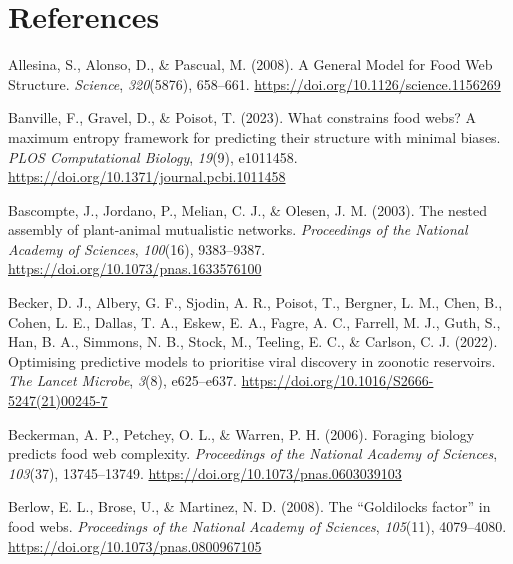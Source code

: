 \documentclass[
]{article}
\newlength{\cslhangindent}
\newenvironment{CSLReferences}[2] %
 {\begin{list}{}{%
  \setlength{\itemindent}{0pt}
  \setlength{\leftmargin}{0pt}
  \setlength{\parsep}{0pt}
  \ifodd #1
   \setlength{\leftmargin}{\cslhangindent}
   \setlength{\itemindent}{-1\cslhangindent}
  \fi
  \setlength{\itemsep}{#2\baselineskip}}}
 {\end{list}}
\begin{document}
\section*{References}\label{references}

\label{refs}
\begin{CSLReferences}{1}{0}
Allesina, S., Alonso, D., \& Pascual, M. (2008). A {General Model} for
{Food Web Structure}. \emph{Science}, \emph{320}(5876), 658--661.
\url{https://doi.org/10.1126/science.1156269}

Banville, F., Gravel, D., \& Poisot, T. (2023). What constrains food
webs? {A} maximum entropy framework for predicting their structure with
minimal biases. \emph{PLOS Computational Biology}, \emph{19}(9),
e1011458. \url{https://doi.org/10.1371/journal.pcbi.1011458}

Bascompte, J., Jordano, P., Melian, C. J., \& Olesen, J. M. (2003). The
nested assembly of plant-animal mutualistic networks. \emph{Proceedings
of the National Academy of Sciences}, \emph{100}(16), 9383--9387.
\url{https://doi.org/10.1073/pnas.1633576100}

Becker, D. J., Albery, G. F., Sjodin, A. R., Poisot, T., Bergner, L. M.,
Chen, B., Cohen, L. E., Dallas, T. A., Eskew, E. A., Fagre, A. C.,
Farrell, M. J., Guth, S., Han, B. A., Simmons, N. B., Stock, M.,
Teeling, E. C., \& Carlson, C. J. (2022). Optimising predictive models
to prioritise viral discovery in zoonotic reservoirs. \emph{The Lancet
Microbe}, \emph{3}(8), e625--e637.
\url{https://doi.org/10.1016/S2666-5247(21)00245-7}

Beckerman, A. P., Petchey, O. L., \& Warren, P. H. (2006). Foraging
biology predicts food web complexity. \emph{Proceedings of the National
Academy of Sciences}, \emph{103}(37), 13745--13749.
\url{https://doi.org/10.1073/pnas.0603039103}

Berlow, E. L., Brose, U., \& Martinez, N. D. (2008). The {``{Goldilocks}
factor''} in food webs. \emph{Proceedings of the National Academy of
Sciences}, \emph{105}(11), 4079--4080.
\url{https://doi.org/10.1073/pnas.0800967105}


\end{CSLReferences}
\end{document}
